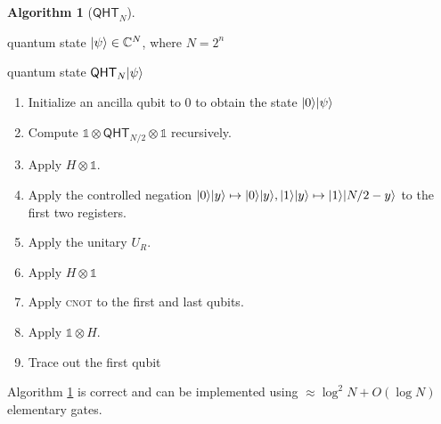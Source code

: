 \documentclass[11pt]{article}
\theoremstyle{definition}
\newtheorem{algorithm}{Algorithm}
\newcommand{\qht}{\mathsf{QHT}}
\begin{document}
\begin{algorithm}[$\qht_N$] \
    \label{alg:qht-N}
    \begin{description}[font = \normalfont\itshape, itemsep = 0mm, parsep = 0mm, topsep = 1mm]
        \item [Input:] quantum state $\lvert\psi\rangle \in \mathbb{C}^N$, where $N = 2^n$
        \item [Output:] quantum state $\qht_N\ket{\psi}$
    \end{description}

    \begin{enumerate}[itemsep = 0mm, parsep = 1mm, topsep = 1mm]
        \item Initialize an ancilla qubit to $0$ to obtain the state $\lvert0\rangle\lvert\psi\rangle$
        \item Compute $\mathds{1} \otimes \qht_{N / 2} \otimes \mathds{1}$ recursively.
        \item Apply $H \otimes \mathds{1}$.
        \item\label{stp:ngt} Apply the controlled negation $\lvert0\rangle\lvert y\rangle \mapsto \lvert0\rangle\lvert y\rangle, \lvert1\rangle\lvert y\rangle \mapsto \lvert1\rangle\lvert N / 2 -y\rangle$ to the first two registers.
        \item Apply the unitary $U_R$.
        \item Apply $H \otimes \mathds{1}$
        \item Apply \textsc{cnot} to the first and last qubits.
        \item Apply $\mathds{1} \otimes H$.
        \item Trace out the first qubit
    \end{enumerate}
\end{algorithm}


\begin{theorem}
    \label{thm:qht-cost}
    Algorithm \ref{alg:qht-N} is correct and can be implemented using $\approx \log^2 N + O(\log N)$ elementary gates.
\end{theorem}
\end{document}
